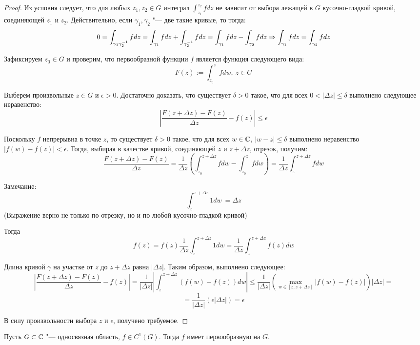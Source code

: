 \begin{proof}
	Из условия следует, что для любых $z_1, z_2 \in G$ интеграл $\int_{z_1}^{z_2} fdz$ не зависит от выбора лежащей в $G$ кусочно-гладкой кривой, соединяющей $z_1$ и $z_2$. Действительно, если $\gamma_1, \gamma_2$ "--- две такие кривые, то тогда:
	\[0 = \int_{\gamma_1\gamma_2^{-1}}fdz = \int_{\gamma_1}fdz + \int_{\gamma_2^{-1}}fdz = \int_{\gamma_1}fdz - \int_{\gamma_2}fdz \Rightarrow \int_{\gamma_1}fdz = \int_{\gamma_2}fdz\]
	
	Зафиксируем $z_0 \in G$ и проверим, что первообразной функции $f$ является функция следующего вида:
	\[F(z) := \int_{z_0}^zfdw,~z \in G\]
	
	Выберем произвольные $z \in G$ и $\epsilon > 0$. Достаточно доказать, что существует $\delta > 0$ такое, что для всех $0 < |\Delta z| \le \delta$ выполнено следующее неравенство:
	\[\left|\frac{F(z + \Delta z) - F(z)}{\Delta z} - f(z)\right| \le \epsilon\]
	
	Поскольку $f$ непрерывна в точке $z$, то существует $\delta > 0$ такое, что для всех $w \in \mathbb{C}$, $|w - z| \le \delta$ выполнено неравенство $|f(w) - f(z)| < \epsilon$. Тогда, выбирая в качестве кривой, соединяющей $z$ и $z + \Delta z$, отрезок, получим:
	\[\frac{F(z + \Delta z) - F(z)}{\Delta z} = \frac{1}{\Delta z}\left(\int_{z_0}^{z + \Delta z}fdw - \int_{z_0}^{z}fdw\right) = \frac{1}{\Delta z}\int_{z}^{z + \Delta z}fdw\]

        Замечание:
        \[\int_z^{z + \Delta z} 1 dw\ = \Delta z\] (Выражение верно не только по отрезку, но и по любой кусочно-гладкой кривой)

        Тогда
        \[f(z) = f(z) \frac{1}{\Delta z}\int_z^{z + \Delta z} 1 dw = \frac{1}{\Delta z}\int_z^{z + \Delta z} f(z) dw\]
	
	Длина кривой $\gamma$ на участке от $z$ до $z + \Delta z$ равна $|\Delta z|$. Таким образом, выполнено следующее:
	\[\left|\frac{F(z + \Delta z) - F(z)}{\Delta z} - f(z)\right| = \frac1{|\Delta z|}\left|\int_z^{z + \Delta z}\left(f(w) - f(z)\right)dw\right| \le \frac1{|\Delta z|}\left(\max_{w \in [z, z + \Delta z]}\left|f(w) - f(z)\right|\right)|\Delta z| =\]
        \[= \frac1{|\Delta z|}(\epsilon|\Delta z|) = \epsilon\]
	
	В силу произвольности выбора $z$ и $\epsilon$, получено требуемое.
\end{proof}

\begin{corollary}
	Пусть $G \subset \mathbb{C}$ "--- односвязная область, $f \in C^1(G)$. Тогда $f$ имеет первообразную на $G$.
\end{corollary}

